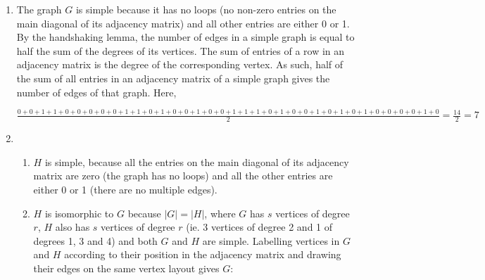 \documentclass[10pt]{article}
\begin{document}
\begin{enumerate}
\begin{enumerate}
.
            \item 
                The graph $G$ is simple because it has no loops (no non-zero
                entries on the main diagonal of its adjacency matrix) and all
                other entries are either 0 or 1. By the handshaking lemma, the
                number of edges in a simple graph is equal to half the sum of
                the degrees of its vertices. The sum of entries of a row in an
                adjacency matrix is the degree of the corresponding vertex. As
                such, half of the sum of all entries in an adjacency matrix of
                a simple graph gives the number of edges of that graph. Here,

                $\frac{0 + 0 + 1 + 1 + 0 + 0 +
                 0 + 0 + 0 + 1 + 1 + 0 +
                 1 + 0 + 0 + 1 + 0 + 0 +
                 1 + 1 + 1 + 0 + 1 + 0 +
                 0 + 1 + 0 + 1 + 0 + 1 +
                 0 + 0 + 0 + 0 + 1 + 0}{2} = \frac{14}{2} = 7$
            \item
                \begin{enumerate}
                    \item $H$ is simple, because all the entries on the main
                        diagonal of its adjacency matrix are zero (the graph
                        has no loops) and all the other entries are either 0 or
                        1 (there are no multiple edges).
                    \item $H$ is isomorphic to $G$ because $|G| = |H|$, where
                        $G$ has $s$ vertices of degree $r$, $H$ also has $s$
                        vertices of degree $r$ (ie. 3 vertices of degree 2 and
                        1 of degrees 1, 3 and 4) and both $G$ and $H$ are
                        simple.
                        Labelling vertices in $G$ and $H$ according to their
                        position in the adjacency matrix and drawing their
                        edges on the same vertex layout gives $G$:
\end{enumerate}
\end{enumerate}
\end{enumerate}
\end{document}
